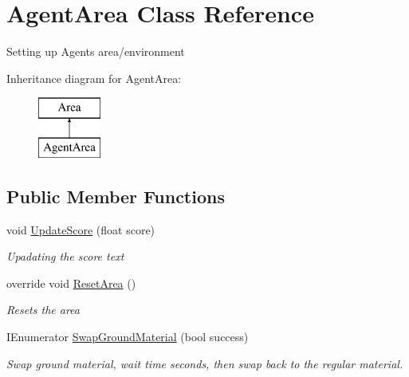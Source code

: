 \hypertarget{class_agent_area}{}\section{Agent\+Area Class Reference}
\label{class_agent_area}


Setting up Agents area/environment  


Inheritance diagram for Agent\+Area\+:\begin{figure}[H]
\begin{center}
\leavevmode
\includegraphics[height=2.000000cm]{class_agent_area}
\end{center}
\end{figure}
\subsection*{Public Member Functions}
\begin{DoxyCompactItemize}
\item 
void \mbox{\hyperlink{class_agent_area_acad084bde8fa76938b06896cfef7befb}{Update\+Score}} (float score)
\begin{DoxyCompactList}\small\item\em Upadating the score text \end{DoxyCompactList}\item 
override void \mbox{\hyperlink{class_agent_area_a99721d7bcaa1fb9dbd06ce797fe446c9}{Reset\+Area}} ()
\begin{DoxyCompactList}\small\item\em Resets the area \end{DoxyCompactList}\item 
I\+Enumerator \mbox{\hyperlink{class_agent_area_a2324888e59275143c15b71a4370cbc36}{Swap\+Ground\+Material}} (bool success)
\begin{DoxyCompactList}\small\item\em Swap ground material, wait time seconds, then swap back to the regular material. \end{DoxyCompactList}\end{DoxyCompactItemize}
